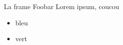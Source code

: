 \begin{frame}{La frame Foobar}
  Lorem ipsum, coucou
  \begin{itemize}
    \item bleu
    \item vert
  \end{itemize}
\end{frame} 
